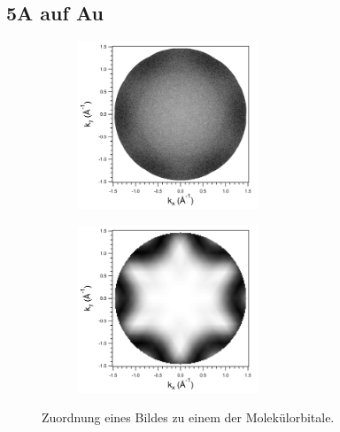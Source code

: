         \subsection{5A auf Au}
            \begin{figure}
                \centering
                \begin{subfigure}[t]{0.48\textwidth}
                    \centering
                    \includegraphics[height=5cm]{./content/pictures/Au+5A/IMAGE_2021_06_17_005_BE0_8}
                \end{subfigure}
                \begin{subfigure}[t]{0.48\textwidth}
                    \centering
                    \includegraphics[height=5cm]{./content/pictures/Au+5A/HOMO1_all_CT}
                \end{subfigure}
                \caption{Zuordnung eines Bildes zu einem der Molekülorbitale.}
                \label{fig:MOT}
            \end{figure}

